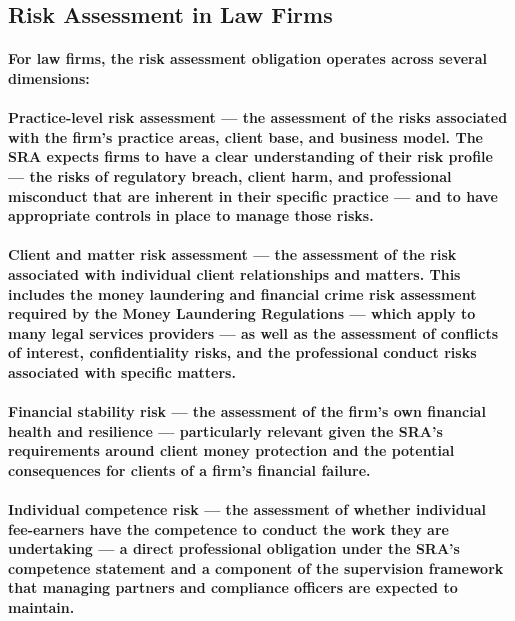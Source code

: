 \subsection{Risk Assessment in Law Firms}
\paragraph{For law firms, the risk assessment obligation operates across several dimensions:}
\paragraph{\textbf{Practice-level risk assessment} — the assessment of the risks associated with the firm's practice areas, client base, and business model. The SRA expects firms to have a clear understanding of their risk profile — the risks of regulatory breach, client harm, and professional misconduct that are inherent in their specific practice — and to have appropriate controls in place to manage those risks.}
\paragraph{\textbf{Client and matter risk assessment} — the assessment of the risk associated with individual client relationships and matters. This includes the money laundering and financial crime risk assessment required by the Money Laundering Regulations — which apply to many legal services providers — as well as the assessment of conflicts of interest, confidentiality risks, and the professional conduct risks associated with specific matters.}
\paragraph{\textbf{Financial stability risk} — the assessment of the firm's own financial health and resilience — particularly relevant given the SRA's requirements around client money protection and the potential consequences for clients of a firm's financial failure.}
\paragraph{\textbf{Individual competence risk} — the assessment of whether individual fee-earners have the competence to conduct the work they are undertaking — a direct professional obligation under the SRA's competence statement and a component of the supervision framework that managing partners and compliance officers are expected to maintain.}

